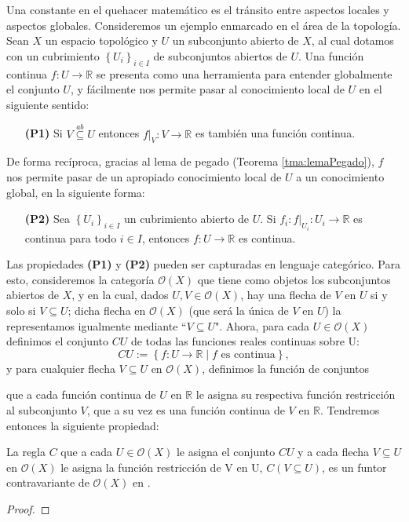 Una constante en el quehacer matemático es el tránsito entre aspectos locales y aspectos globales. Consideremos un ejemplo enmarcado en el área de la topología. Sean $X$ un espacio topológico y $U$ un subconjunto abierto de $X$, al cual dotamos con un cubrimiento $\left\lbrace U_i\right\rbrace_{i\in I}$ de subconjuntos abiertos de $U$. Una función continua $f:U\to \mathbb{R}$ se presenta como una herramienta para entender globalmente el conjunto $U$, y fácilmente nos permite pasar al conocimiento local de $U$ en el siguiente sentido:
\begin{itemize}
   \item[\textbf{(P1)}] Si $V\stackrel{ab}\subseteq U$ entonces $f|_V:V\to\mathbb{R}$ es también una función continua. 
\end{itemize}
De forma recíproca, gracias al lema de pegado (Teorema \ref{tma:lemaPegado}), $f$ nos permite pasar de un apropiado conocimiento local de $U$ a un conocimiento global, en la siguiente forma:
\begin{itemize}
   \item[\textbf{(P2)}] Sea $\left\lbrace U_i\right\rbrace_{i\in I}$ un cubrimiento abierto de $U$. Si $f_i:f|_{U_i}:U_i\to\mathbb{R}$ es continua para todo $i\in I$, entonces $f:U\to\mathbb{R}$ es continua.
\end{itemize}
Las propiedades \textbf{(P1)} y \textbf{(P2)} pueden ser capturadas en lenguaje categórico. Para esto, consideremos la categoría $\mathcal{O}(X)$ que tiene como objetos los subconjuntos abiertos de $X$, y en la cual, dados $U,V\in \mathcal{O}(X)$, hay una flecha de $V$ en $U$ si y solo si $V\subseteq U$; dicha flecha en $\mathcal{O}(X)$ (que será la única de $V$ en $U$) la representamos igualmente mediante ``$V\subseteq U$". Ahora, para cada $U\in\mathcal{O}(X)$ definimos el conjunto $CU$ de todas las funciones reales continuas sobre U:
$$
CU:=\left\lbrace f:U\to\mathbb{R}\mid f \text{ es continua}\right\rbrace,
$$
y para cualquier flecha $V\subseteq U$ en $\mathcal{O}(X)$, definimos la función de conjuntos

que a cada función continua de $U$ en $\mathbb{R}$ le asigna su respectiva función restricción al subconjunto $V$, que a su vez es una función continua de $V$ en $\mathbb{R}$. Tendremos entonces la siguiente propiedad:
\begin{prop}
   La regla $C$ que a cada $U\in\mathcal{O}(X)$ le asigna el conjunto $CU$ y a cada flecha $V\subseteq U$ en $\mathcal{O}(X)$ le asigna la función restricción de V en U, $C(V\subseteq U)$, es un funtor contravariante de $\mathcal{O}(X)$ en .
\end{prop}
\begin{proof}
   
\end{proof}
